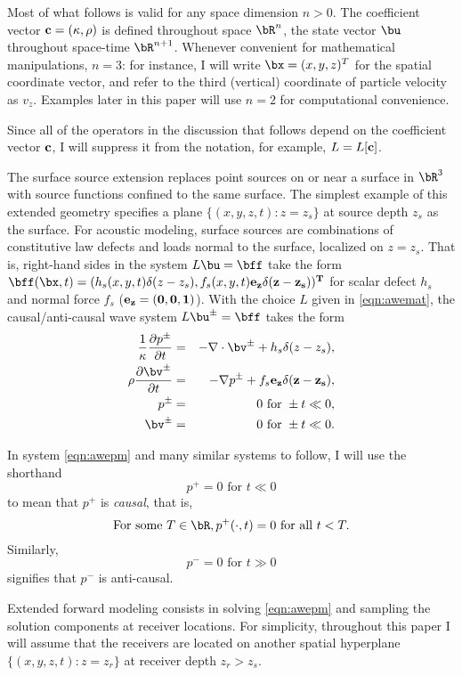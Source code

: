 Most of what follows is valid for any space dimension $n >0$. The
coefficient vector $\bf{c}=(\kappa,\rho)$ is defined throughout space
$\bR^n$, the state vector $\bu$ throughout space-time
$\bR^{n+1}$. Whenever convenient for mathematical manipulations,
$n=3$: for instance, I will write $\bx=(x,y,z)^T$ for the spatial
coordinate vector, and refer to the third (vertical) coordinate of
particle velocity as $v_z$. Examples
later in this paper will use $n=2$ for computational convenience.

Since all of the operators in the discussion that follows depend on
the coefficient vector 
$\bf{c}$, I will suppress it from the notation, for example, $L=L[\bf{c}]$.

The surface source extension replaces point sources on or near a
surface in $\bR^3$ with source functions confined to the same
surface. The simplest example of this extended geometry specifies a
plane $\{(x,y,z,t): z=z_s\}$ at source depth $z_s$ as the surface. For
acoustic modeling, surface sources are combinations of constitutive law
defects and loads normal to the surface, localized on $z=z_s$. That
is, right-hand sides in the system $L\bu=\bff$ take the form
$\bff(\bx,t) = (h_s(x,y,t)\delta(z-z_s),
f_s(x,y,t)\bf{e}_z\delta(z-z_s))^T$ for scalar defect $h_s$ and normal
force $f_s$ ($\bf{e}_z=(0,0,1)$). With the choice $L$ given in
\ref{eqn:awemat}, the causal/anti-causal wave system $L\bu^{\pm}=\bff$
takes the form
\begin{eqnarray}
\label{eqn:awepm}
\frac{1}{\kappa}\frac{\partial p^{\pm}}{\partial t} & = & - \nabla \cdot \bv^{\pm} +
h_s \delta(z-z_s), \nonumber \\
\rho\frac{\partial \bv^{\pm}}{\partial t} & = & - \nabla p^{\pm} + f_s\bf{e}_z \delta(z-z_s),\nonumber \\
p^{\pm} & =& 0 \mbox{ for } \pm t \ll 0,\nonumber\\ 
\bv^{\pm} & = & 0 \mbox{ for } \pm t \ll 0.
\end{eqnarray}

 In system \ref{eqn:awepm} and many similar
systems to follow, I will use the shorthand
\[
  p^+ = 0 \mbox{ for } t \ll 0 
\]
to mean that $p^+$ is {\em causal}, that is,
\[
  \mbox{For some } T \in \bR, p^+(\cdot,t) = 0 \mbox{ for all } t <
  T.
\]
Similarly,
\[
  p^- = 0 \mbox{ for } t \gg 0 
\]
signifies that $p^-$ is anti-causal.

Extended forward modeling consists in solving \ref{eqn:awepm} and
sampling the solution components at receiver locations. For
simplicity, throughout this paper I will assume that the receivers are
located on another spatial hyperplane $\{(x,y,z,t): z=z_r\}$ at
receiver depth $z_r>z_s$.

